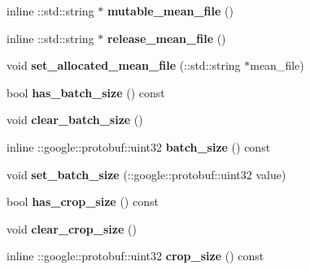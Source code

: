 \begin{DoxyCompactItemize}
inline \+::std\+::string $\ast$ {\bfseries mutable\+\_\+mean\+\_\+file} ()
\item 
\mbox{\label{classcaffe_1_1_window_data_parameter_a7eb2b62bd0830efa4ea87ee941d9f658}} 
inline \+::std\+::string $\ast$ {\bfseries release\+\_\+mean\+\_\+file} ()
\item 
\mbox{\label{classcaffe_1_1_window_data_parameter_aab23dd0b26ee9fe8eda6c30b566ebc41}} 
void {\bfseries set\+\_\+allocated\+\_\+mean\+\_\+file} (\+::std\+::string $\ast$mean\+\_\+file)
\item 
\mbox{\label{classcaffe_1_1_window_data_parameter_aed7ed6fed5132277bc4b3409b6e1a699}} 
bool {\bfseries has\+\_\+batch\+\_\+size} () const
\item 
\mbox{\label{classcaffe_1_1_window_data_parameter_a6ad4ba690c53a864653eebb4356ec488}} 
void {\bfseries clear\+\_\+batch\+\_\+size} ()
\item 
\mbox{\label{classcaffe_1_1_window_data_parameter_a6b50560d0f92cdc9a4d22bba86415010}} 
inline \+::google\+::protobuf\+::uint32 {\bfseries batch\+\_\+size} () const
\item 
\mbox{\label{classcaffe_1_1_window_data_parameter_a3acf60fedd007a2537f0588ff9f275c7}} 
void {\bfseries set\+\_\+batch\+\_\+size} (\+::google\+::protobuf\+::uint32 value)
\item 
\mbox{\label{classcaffe_1_1_window_data_parameter_a5af622e6c08840a6e4f989455748d5fa}} 
bool {\bfseries has\+\_\+crop\+\_\+size} () const
\item 
\mbox{\label{classcaffe_1_1_window_data_parameter_aca3ef2729ef5c24ab5f3b2c5c1dd9e5b}} 
void {\bfseries clear\+\_\+crop\+\_\+size} ()
\item 
\mbox{\label{classcaffe_1_1_window_data_parameter_a489f37152ee7ad03e33b0359082052d2}} 
inline \+::google\+::protobuf\+::uint32 {\bfseries crop\+\_\+size} () const

\end{DoxyCompactItemize}
